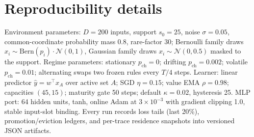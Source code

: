 \documentclass[11pt]{article}
\begin{document}
\section{Reproducibility details}
\label{app:repro}
Environment parameters: $D{=}200$ inputs, support $s_0{=}25$, noise $\sigma{=}0.05$, common-coordinate
probability mass $0.8$, rare-factor $30$; Bernoulli family draws $x_i\sim\mathrm{Bern}(p_i)\cdot
\mathcal N(0,1)$, Gaussian family draws $x_i\sim\mathcal N(0,0.5)$ masked to the support. Regime
parameters: stationary $p_{\mathrm{ch}}=0$; drifting $p_{\mathrm{ch}}=0.002$; volatile
$p_{\mathrm{ch}}=0.01$; alternating swaps two frozen rules every $T/4$ steps. Learner: linear predictor
$\hat y = w^\top x_A$ over active set $A$; SGD $\eta=0.15$; value EMA $\rho=0.98$; capacities
$(45,15)$; maturity gate 50 steps; default $\kappa=0.02$, hysteresis 25. MLP port: 64 hidden units,
tanh, online Adam at $3\times10^{-3}$ with gradient clipping 1.0, stable input-slot binding. Every run
records loss tails (last 20\%), promotion/eviction ledgers, and per-trace residence snapshots into
versioned JSON artifacts.
\end{document}
